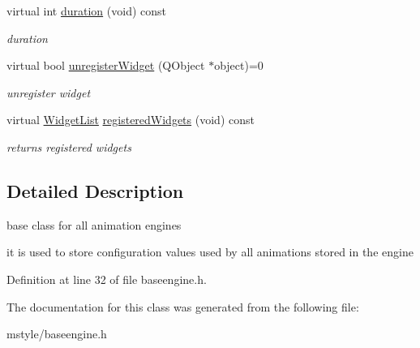 \begin{DoxyCompactItemize}
\mbox{\label{class_base_engine_a7edb8da9d2fd6cca19682d1d089dfa4b}} 
virtual int \hyperlink{class_base_engine_a7edb8da9d2fd6cca19682d1d089dfa4b}{duration} (void) const
\begin{DoxyCompactList}\small\item\em duration \end{DoxyCompactList}\item 
\mbox{\label{class_base_engine_a5ef51c56af129b1516b5d2c59e577b22}} 
virtual bool \hyperlink{class_base_engine_a5ef51c56af129b1516b5d2c59e577b22}{unregister\+Widget} (Q\+Object $\ast$object)=0
\begin{DoxyCompactList}\small\item\em unregister widget \end{DoxyCompactList}\item 
\mbox{\label{class_base_engine_a7b2fcb1bb576a57f6149c326c5c60e19}} 
virtual \hyperlink{class_base_engine_a2b0faec98a7eb68c91b502459c46a9c7}{Widget\+List} \hyperlink{class_base_engine_a7b2fcb1bb576a57f6149c326c5c60e19}{registered\+Widgets} (void) const
\begin{DoxyCompactList}\small\item\em returns registered widgets \end{DoxyCompactList}\end{DoxyCompactItemize}


\subsection{Detailed Description}
base class for all animation engines 

it is used to store configuration values used by all animations stored in the engine 

Definition at line 32 of file baseengine.\+h.



The documentation for this class was generated from the following file\+:\begin{DoxyCompactItemize}
\item 
mstyle/baseengine.\+h\end{DoxyCompactItemize}
